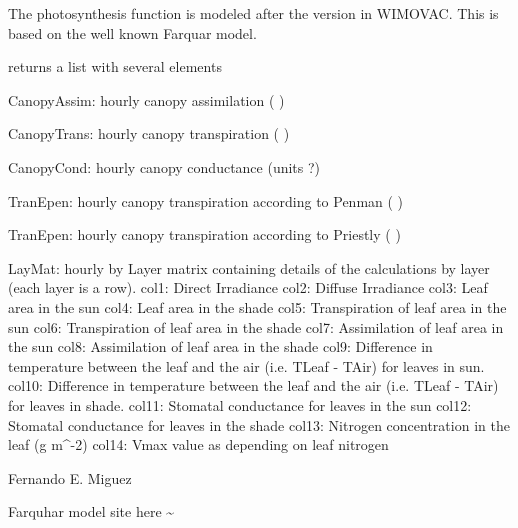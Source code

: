 \documentclass[letterpaper]{book}
\begin{document}
%
\begin{Details}\relax
The photosynthesis function is modeled after the version
in WIMOVAC.  This is based on the well known Farquar
model.
\end{Details}
%
\begin{Value}

returns a list with several elements

CanopyAssim: hourly canopy assimilation ( )

CanopyTrans: hourly canopy transpiration ( )

CanopyCond: hourly canopy conductance (units ?)

TranEpen: hourly canopy transpiration according to Penman
( )

TranEpen: hourly canopy transpiration according to
Priestly ( )

LayMat: hourly by Layer matrix containing details of the
calculations by layer (each layer is a row).  col1:
Direct Irradiance col2: Diffuse Irradiance col3: Leaf
area in the sun col4: Leaf area in the shade col5:
Transpiration of leaf area in the sun col6: Transpiration
of leaf area in the shade col7: Assimilation of leaf area
in the sun col8: Assimilation of leaf area in the shade
col9: Difference in temperature between the leaf and the
air (i.e. TLeaf - TAir) for leaves in sun.  col10:
Difference in temperature between the leaf and the air
(i.e. TLeaf - TAir) for leaves in shade.  col11: Stomatal
conductance for leaves in the sun col12: Stomatal
conductance for leaves in the shade col13: Nitrogen
concentration in the leaf (g m\textasciicircum{}-2) col14: Vmax value as
depending on leaf nitrogen
\end{Value}
%
\begin{Author}\relax
Fernando E. Miguez
\end{Author}
%
\begin{References}\relax
Farquhar model 
site here \textasciitilde{}
\end{References}
%
\begin{Examples}
\end{Examples}
\end{document}
